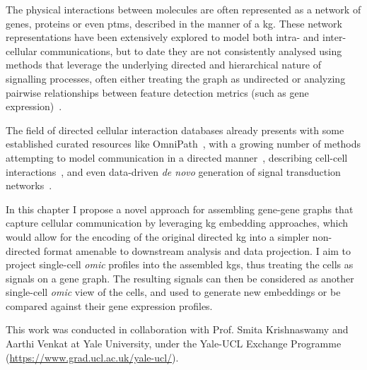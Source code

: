 The physical interactions between molecules are often represented as a network of genes, proteins or even \acrshort{ptm}s, described in the manner of a \acrfull{kg}. These network representations have been extensively explored to model both intra- and inter-cellular communications, but to date they are not consistently analysed using methods that leverage the underlying directed and hierarchical nature of signalling processes, often either treating the graph as undirected or analyzing pairwise relationships between feature detection metrics (such as gene expression)~\cite{pratapa_benchmarking_2020, armingol_deciphering_2020}. 

The field of directed cellular interaction databases already presents with some established curated resources like OmniPath~\cite{turei_integrated_2021}, with a growing number of methods attempting to model communication in a directed manner~\cite{lefebvre_large-scale_2021}, describing cell-cell interactions~\cite{fischer_modeling_2022,yang_sctenifoldxct_2023}, and even data-driven \emph{de novo} generation of signal transduction networks~\cite{hu_cytotalk_2021}.

In this chapter I propose a novel approach for assembling gene-gene graphs that capture cellular communication by leveraging \acrshort{kg} embedding approaches, which would allow for the encoding of the original directed \acrshort{kg} into a simpler non-directed format amenable to downstream analysis and data projection. I aim to project single-cell \emph{omic} profiles into the assembled \acrshort{kg}s, thus treating the cells as signals on a gene graph. The resulting signals can then be considered as another single-cell \emph{omic} view of the cells, and used to generate new embeddings or be compared against their gene expression profiles.

This work was conducted in collaboration with Prof. Smita Krishnaswamy and Aarthi Venkat at Yale University, under the Yale-UCL Exchange Programme (\url{https://www.grad.ucl.ac.uk/yale-ucl/}).

